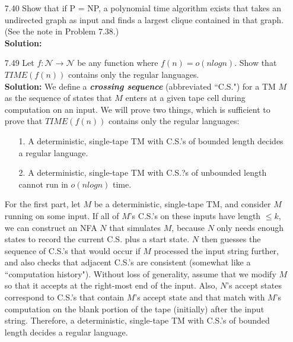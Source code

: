\begin{enumerate}
\item[7.40]Show that if P = NP, a polynomial time algorithm exists that takes an undirected graph as input and finds a largest clique contained in that graph. (See the note in Problem 7.38.)
\\
\textbf{Solution:} \alreadyanswered

\item[7.49]Let $f: \mathcal{N} \rightarrow \mathcal{N}$ be any function where $f(n) = o(n log n)$. Show that $TIME(f(n))$ contains only the regular languages.
\\
\textbf{Solution:} We define a \textbf{\emph{crossing sequence}} (abbreviated ``C.S.") for a TM $M$ as the sequence of states that $M$ enters at a given tape cell during computation on an input. We will prove two things, which is sufficient to prove that $TIME(f(n))$ contains only the regular languages:
\begin{enumerate}
\item[1.]A deterministic, single-tape TM with C.S.'s of bounded length decides a regular language.
\item[2.]A deterministic, single-tape TM with C.S.?s of unbounded length cannot run in $o(n log n)$ time. 
\end{enumerate}

\par For the first part, let $M$ be a deterministic, single-tape TM, and consider $M$ running on some input. If all of $M$'s C.S.'s on these inputs have length $\le k$, we can construct an NFA $N$ that simulates $M$, because $N$ only needs enough states to record the current C.S. plus a start state. $N$ then guesses the sequence of C.S.'s that would occur if $M$ processed the input string further, and also checks that adjacent C.S.'s are consistent (somewhat like a ``computation history"). Without loss of generality, assume that we modify $M$ so that it accepts at the right-most end of the input. Also, $N$'s accept states correspond to C.S.'s that contain $M$'s accept state and that match with $M$'s computation on the blank portion of the tape (initially) after the input string. Therefore, a deterministic, single-tape TM with C.S.'s of bounded length decides a regular language.


\end{enumerate}
